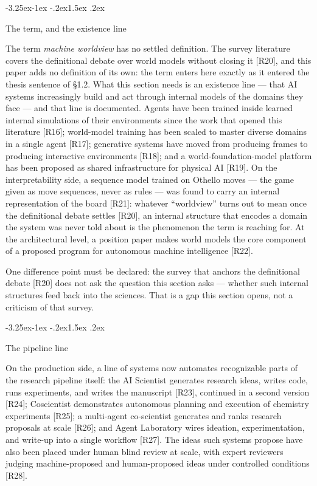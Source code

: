 \documentclass[11pt,a4paper]{article}
\makeatletter
\renewcommand\subsection{\@startsection{subsection}{2}{\z@}%
  {-3.25ex\@plus -1ex \@minus -.2ex}{1.5ex \@plus .2ex}%
  {\normalfont\large\bfseries\raggedright}}
\makeatother
\begin{document}
\subsection{The term, and the existence line}

The term \textit{machine worldview} has no settled definition. The survey literature covers the definitional debate over world models without closing it [R20], and this paper adds no definition of its own: the term enters here exactly as it entered the thesis sentence of §1.2. What this section needs is an existence line — that AI systems increasingly build and act through internal models of the domains they face — and that line is documented. Agents have been trained inside learned internal simulations of their environments since the work that opened this literature [R16]; world-model training has been scaled to master diverse domains in a single agent [R17]; generative systems have moved from producing frames to producing interactive environments [R18]; and a world-foundation-model platform has been proposed as shared infrastructure for physical AI [R19]. On the interpretability side, a sequence model trained on Othello moves — the game given as move sequences, never as rules — was found to carry an internal representation of the board [R21]: whatever ``worldview'' turns out to mean once the definitional debate settles [R20], an internal structure that encodes a domain the system was never told about is the phenomenon the term is reaching for. At the architectural level, a position paper makes world models the core component of a proposed program for autonomous machine intelligence [R22].

One difference point must be declared: the survey that anchors the definitional debate [R20] does not ask the question this section asks — whether such internal structures feed back into the sciences. That is a gap this section opens, not a criticism of that survey.

\subsection{The pipeline line}

On the production side, a line of systems now automates recognizable parts of the research pipeline itself: the AI Scientist generates research ideas, writes code, runs experiments, and writes the manuscript [R23], continued in a second version [R24]; Coscientist demonstrates autonomous planning and execution of chemistry experiments [R25]; a multi-agent co-scientist generates and ranks research proposals at scale [R26]; and Agent Laboratory wires ideation, experimentation, and write-up into a single workflow [R27]. The ideas such systems propose have also been placed under human blind review at scale, with expert reviewers judging machine-proposed and human-proposed ideas under controlled conditions [R28].
\end{document}
